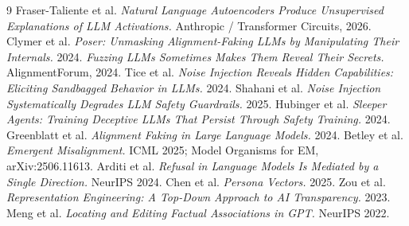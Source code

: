 \documentclass[11pt]{article}
\begin{document}
\begin{thebibliography}{9}
\small
{} Fraser-Taliente et al. \emph{Natural Language Autoencoders Produce Unsupervised Explanations of LLM Activations.} Anthropic / Transformer Circuits, 2026.
 Clymer et al. \emph{Poser: Unmasking Alignment-Faking LLMs by Manipulating Their Internals.} 2024.
 \emph{Fuzzing LLMs Sometimes Makes Them Reveal Their Secrets.} AlignmentForum, 2024.
 Tice et al. \emph{Noise Injection Reveals Hidden Capabilities: Eliciting Sandbagged Behavior in LLMs.} 2024.
 Shahani et al. \emph{Noise Injection Systematically Degrades LLM Safety Guardrails.} 2025.
 Hubinger et al. \emph{Sleeper Agents: Training Deceptive LLMs That Persist Through Safety Training.} 2024.
 Greenblatt et al. \emph{Alignment Faking in Large Language Models.} 2024.
 Betley et al. \emph{Emergent Misalignment.} ICML 2025; Model Organisms for EM, arXiv:2506.11613.
 Arditi et al. \emph{Refusal in Language Models Is Mediated by a Single Direction.} NeurIPS 2024.
 Chen et al. \emph{Persona Vectors.} 2025.
 Zou et al. \emph{Representation Engineering: A Top-Down Approach to AI Transparency.} 2023.
 Meng et al. \emph{Locating and Editing Factual Associations in GPT.} NeurIPS 2022.
\end{thebibliography}
\end{document}

